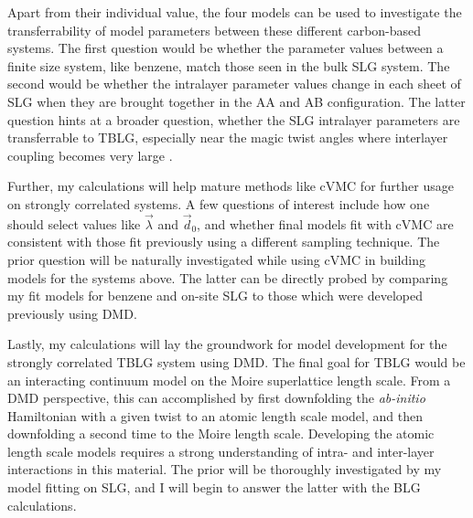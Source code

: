 \documentclass[12pt]{article}
\begin{document}
Apart from their individual value, the four models can be used to investigate the transferrability of model parameters between these different carbon-based systems.
The first question would be whether the parameter values between a finite size system, like benzene, match those seen in the bulk SLG system.
The second would be whether the intralayer parameter values change in each sheet of SLG when they are brought together in the AA and AB configuration.
The latter question hints at a broader question, whether the SLG intralayer parameters are transferrable to TBLG, especially near the magic twist angles where interlayer coupling becomes very large \cite{Bistritzer2	011}.

Further, my calculations will help mature methods like cVMC for further usage on strongly correlated systems.
A few questions of interest include how one should select values like $\vec{\lambda}$ and $\vec{d}_0$, and whether final models fit with cVMC are consistent with those fit previously using a different sampling technique.
The prior question will be naturally investigated while using cVMC in building models for the systems above.
The latter can be directly probed by comparing my fit models for benzene and on-site SLG to those which were developed previously using DMD.

Lastly, my calculations will lay the groundwork for model development for the strongly correlated TBLG system using DMD.
The final goal for TBLG would be an interacting continuum model on the Moire superlattice length scale.
From a DMD perspective, this can accomplished by first downfolding the \textit{ab-initio} Hamiltonian with a given twist to an atomic length scale model, and then downfolding a second time to the Moire length scale.
Developing the atomic length scale models requires a strong understanding of intra- and inter-layer interactions in this material.
The prior will be thoroughly investigated by my model fitting on SLG, and I will begin to answer the latter with the BLG calculations.
\end{document}

